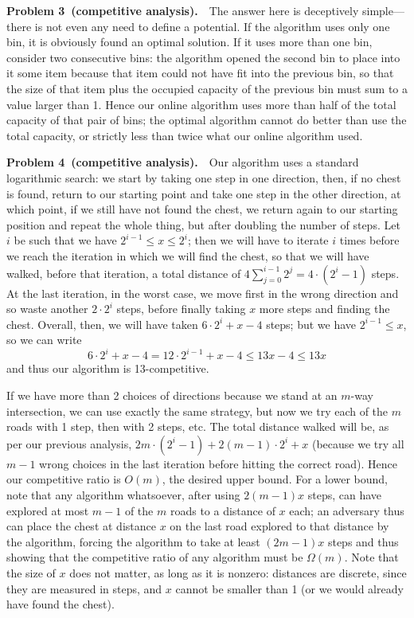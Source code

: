 \documentclass[11pt,a4paper]{article}
\begin{document}
\bigskip\noindent
\textbf{Problem 3~(competitive analysis).}\ \ 
The answer here is deceptively simple---there is not even any need to define
a potential.  If the algorithm uses only one bin, it is obviously found
an optimal solution.  If it uses more than one bin, consider two consecutive
bins: the algorithm opened the second bin to place into it some item
because that item could not have fit into the previous bin, so that the
size of that item plus the occupied capacity of the previous bin must sum
to a value larger than 1.  Hence our online algorithm uses more than half
of the total capacity of that pair of bins; the optimal algorithm cannot
do better than use the total capacity, or strictly less than twice what
our online algorithm used.


\bigskip\noindent
\textbf{Problem 4~(competitive analysis).}\ \ 
Our algorithm uses a standard logarithmic search:
we start by taking one step in one direction, then, if no chest
is found, return to our starting point and take one step in the other direction,
at which point, if we still have not found the chest, we return again to
our starting position and repeat the whole thing, but after doubling the number
of steps.  Let $i$ be such that we have $2^{i-1}\leq x\leq 2^i$; then we will
have to iterate $i$ times before we reach the iteration in which we will
find the chest, so that we will have walked, before that iteration, a
total distance of $4\sum_{j=0}^{i-1} 2^j = 4\cdot(2^i-1)$ steps.  At the
last iteration, in the worst case, we move first in the wrong direction
and so waste another $2\cdot 2^i$ steps, before finally taking $x$ more steps
and finding the chest.  Overall, then, we will have taken $6\cdot 2^i + x -4$
steps; but we have $2^{i-1}\leq x$, so we can write
  $$6\cdot 2^i + x -4 = 12\cdot 2^{i-1} + x - 4 \leq 13x -4 \leq 13x$$
and thus our algorithm is 13-competitive.

If we have more than 2 choices of directions because we stand at an $m$-way
intersection, we can use exactly the same strategy, but now we try each of the
$m$ roads with 1 step, then with 2 steps, etc.  The total distance walked will
be, as per our previous analysis, $2m\cdot (2^i-1) + 2(m-1)\cdot 2^i + x$
(because we try all $m-1$ wrong choices in the last iteration before hitting
the correct road).  Hence our competitive ratio is $O(m)$, the desired
upper bound.  For a lower bound, note that any algorithm whatsoever, after
using $2(m-1)x$ steps, can have explored at most $m-1$ of the $m$ roads to a
distance of $x$ each; an adversary thus can place the chest at distance $x$ on
the last road explored to that distance by the algorithm, forcing the algorithm
to take at least $(2m-1)x$ steps and thus showing that the competitive ratio of
any algorithm must be $\Omega(m)$.
Note that the size of $x$ does not matter, as long as it is nonzero: distances
are discrete, since they are measured in steps, and $x$ cannot be smaller than
1 (or we would already have found the chest).
\end{document}
